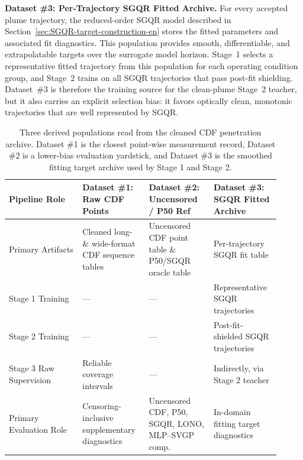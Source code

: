 \textbf{Dataset \#3: Per-Trajectory SGQR Fitted Archive.}
For every accepted plume trajectory, the reduced-order SGQR model described in Section~\ref{sec:SGQR-target-construction-en} stores the fitted parameters and associated fit diagnostics. This population provides smooth, differentiable, and extrapolatable targets over the surrogate model horizon. Stage~1 selects a representative fitted trajectory from this population for each operating condition group, and Stage~2 trains on all SGQR trajectories that pass post-fit shielding. Dataset~\#3 is therefore the training source for the clean-plume Stage~2 teacher, but it also carries an explicit selection bias: it favors optically clean, monotonic trajectories that are well represented by SGQR.

\begin{table}[!ht]
\centering
\footnotesize
\setlength{\tabcolsep}{3pt}
\begin{tabular}{@{}L{0.25\linewidth}L{0.22\linewidth}L{0.22\linewidth}L{0.22\linewidth}@{}}
\toprule
Pipeline Role & Dataset \#1: Raw CDF Points & Dataset \#2: Uncensored / P50 Ref & Dataset \#3: SGQR Fitted Archive \\
\midrule
Primary Artifacts & Cleaned long- \& wide-format CDF sequence tables & Uncensored CDF point table \& P50/SGQR oracle table & Per-trajectory SGQR fit table \\
\midrule
Stage 1 Training & --- & --- & Representative SGQR trajectories \\
Stage 2 Training & --- & --- & Post-fit-shielded SGQR trajectories \\
Stage 3 Raw Supervision & Reliable coverage intervals & --- & Indirectly, via Stage 2 teacher \\
\midrule
Primary Evaluation Role & Censoring-inclusive supplementary diagnostics & Uncensored CDF, P50, SGQR, LONO, MLP--SVGP comp. & In-domain fitting target diagnostics \\
\bottomrule
\end{tabular}
\caption{Three derived populations read from the cleaned CDF penetration archive. Dataset \#1 is the closest point-wise measurement record, Dataset \#2 is a lower-bias evaluation yardstick, and Dataset \#3 is the smoothed fitting target archive used by Stage 1 and Stage 2.}
\label{tab:three-derived-populations}
\end{table}

